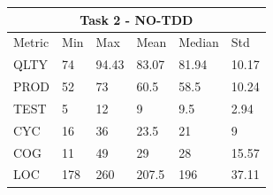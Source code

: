 \noindent
\begin{tabular}{ |p{2cm}||p{1.6cm}|p{1.6cm}|p{1.6cm}|p{1.6cm}|p{1.6cm}|}
    \hline
        \multicolumn{6}{|c|}{Task 2 - NO-TDD} \\
    \hline
        Metric & Min & Max & Mean & Median & Std\\
    \hline
        QLTY & 74 & 94.43 & 83.07 & 81.94 & 10.17 \\
        PROD & 52 & 73 & 60.5 & 58.5 & 10.24 \\
        TEST & 5 & 12 & 9 & 9.5 & 2.94 \\
        CYC & 16 & 36 & 23.5 & 21 & 9 \\
        COG & 11 & 49 & 29 & 28 & 15.57 \\
        LOC & 178 & 260 & 207.5 & 196 & 37.11 \\
    \hline
\end{tabular}
\\ \  \\
